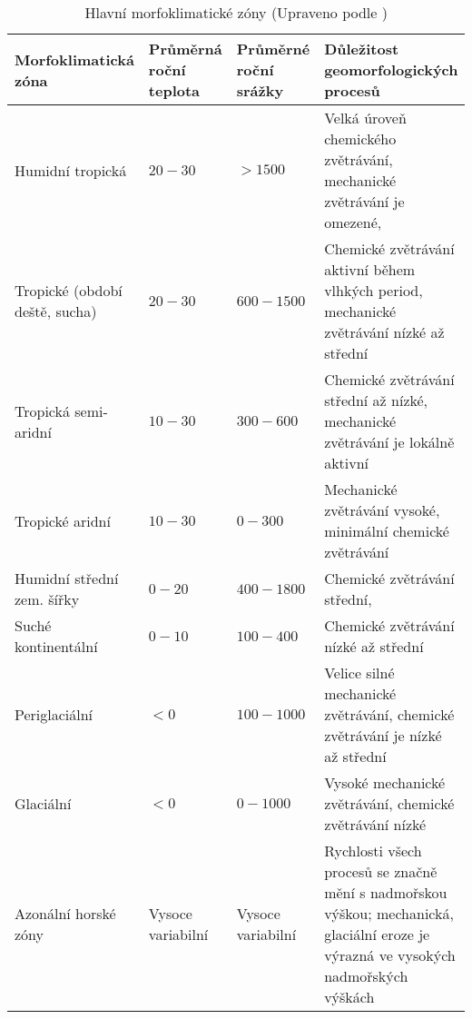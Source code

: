 \begin{table*}[]
	\small
	\begin{tabularx}{1\textwidth}{@{}lp{2cm}p{2cm}X@{}}
		\toprule
		Morfoklimatická zóna       & Průměrná roční teplota & Průměrné roční srážky & Důležitost geomorfologických procesů                                           \\ \midrule
		Humidní tropická           & $20-30$                 & $>1500$                 & Velká úroveň chemického zvětrávání, mechanické zvětrávání je omezené,          \\
		Tropické (období deště, sucha) &
		$20-30$ &
		$600-1500$ &
		Chemické zvětrávání aktivní během vlhkých period, mechanické zvětrávání nízké až střední \\
		Tropická semi-aridní       & $10-30$                  & $300-600$               & Chemické zvětrávání střední až nízké, mechanické zvětrávání je lokálně aktivní \\
		Tropické aridní            & $10-30$                  & $0-300$                 & Mechanické zvětrávání vysoké, minimální chemické zvětrávání                    \\
		Humidní střední zem. šířky & $0-20$                   & $400-1800$              & Chemické zvětrávání střední,                                                   \\
		Suché kontinentální        & $0-10$                   & $100-400$               & Chemické zvětrávání nízké až střední                                           \\
		Periglaciální              & $<0$                     & $100-1000$              & Velice silné mechanické zvětrávání, chemické zvětrávání je nízké až střední    \\
		Glaciální                  & $<0$                     & $0-1000$                & Vysoké mechanické zvětrávání, chemické zvětrávání nízké                        \\
		Azonální horské zóny &
		Vysoce variabilní &
		Vysoce variabilní &
		Rychlosti všech procesů se značně mění s nadmořskou výškou; mechanická, glaciální eroze je výrazná ve vysokých nadmořských výškách \\ \bottomrule
	\end{tabularx}
	\caption{Hlavní morfoklimatické zóny (Upraveno podle \textcite{summerfieldGlobalGeomorphologyIntroduction1999})}
	\label{tab:morfoklimaticke}
\end{table*}
